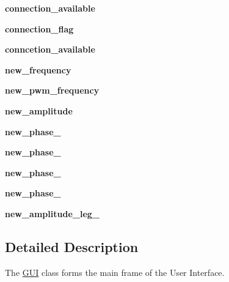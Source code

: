 \begin{DoxyCompactItemize}
{\bfseries connection\+\_\+available}
\item 
\mbox{\label{classuser__interface_1_1GUI_aff964d008ce052e1d86f7d4b66c653ff}} 
{\bfseries connection\+\_\+flag}
\item 
\mbox{\label{classuser__interface_1_1GUI_a5684514732a0a48b954c9b3acc396b76}} 
{\bfseries conncetion\+\_\+available}
\item 
\mbox{\label{classuser__interface_1_1GUI_af4ce5178b0003d72fcc99e7d5c51d672}} 
{\bfseries new\+\_\+frequency}
\item 
\mbox{\label{classuser__interface_1_1GUI_a5b1ab9f1bdbc8e5dc72459d385b864c1}} 
{\bfseries new\+\_\+pwm\+\_\+frequency}
\item 
\mbox{\label{classuser__interface_1_1GUI_a0975c62a45275ef21a20f687ab7cecf6}} 
{\bfseries new\+\_\+amplitude}
\item 
\mbox{\label{classuser__interface_1_1GUI_a1577861e6e142cc8a78b03fa0aeced5c}} 
{\bfseries new\+\_\+phase\+\_}
\item 
\mbox{\label{classuser__interface_1_1GUI_a916db80d68e881fb7722a401e1e4b0e1}} 
{\bfseries new\+\_\+phase\+\_}
\item 
\mbox{\label{classuser__interface_1_1GUI_ab708ec86f72d3e946dee006aadbc7e13}} 
{\bfseries new\+\_\+phase\+\_}
\item 
\mbox{\label{classuser__interface_1_1GUI_a8698af703cc3fc20bb710f91babf481f}} 
{\bfseries new\+\_\+phase\+\_}
\item 
\mbox{\label{classuser__interface_1_1GUI_a97c3ed54f517876b3304fb19fbfa83fe}} 
{\bfseries new\+\_\+amplitude\+\_\+leg\+\_}
\end{DoxyCompactItemize}


\subsection{Detailed Description}
The \hyperlink{classuser__interface_1_1GUI}{G\+UI} class forms the main frame of the User Interface. 

